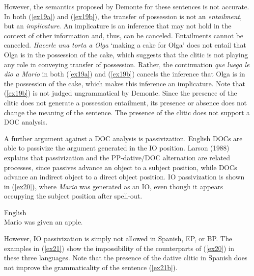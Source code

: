 \documentclass[output=paper,modfonts,nonflat]{langsci/langscibook}
\begin{document}
However, the semantics proposed by Demonte for these sentences is not accurate. In both (\ref{ex19a}) and (\ref{ex19b}), the transfer of possession is not an \textit{entailment}, but an \textit{implicature}. An implicature is an inference that may not hold in the context of other information and, thus, can be canceled. Entailments cannot be canceled. \textit{Hacerle una torta a Olga} ‘making a cake for Olga’ does not entail that Olga is in the possession of the cake, which suggests that the clitic is not playing any role in conveying transfer of possession. Rather, the continuation \textit{que luego le dio a Mario} in both (\ref{ex19a}) and (\ref{ex19b}) cancels the inference that Olga is in the possession of the cake, which makes this inference an implicature. Note that (\ref{ex19b}) is not judged ungrammatical by Demonte. Since the presence of the clitic does not generate a possession entailment, its presence or absence does not change the meaning of the sentence. The presence of the clitic does not support a DOC analysis.

A further argument against a DOC analysis is passivization. English DOCs are able to passivize the argument generated in the IO position. Larson (1988) explains that passivization and the PP-dative/DOC alternation are related processes, since passives advance an object to a subject position, while DOCs advance an indirect object to a direct object position. IO passivization is shown in (\ref{ex20}), where \textit{Mario} was generated as an IO, even though it appears occupying the subject position after spell-out.

\ea \label{ex20} English\\
	Mario was given an apple.
\z

However, IO passivization is simply not allowed in Spanish, EP, or BP. The examples in (\ref{ex21}) show the impossibility of the counterparts of (\ref{ex20}) in these three languages. Note that the presence of the dative clitic in Spanish does not improve the grammaticality of the sentence (\ref{ex21b}).

\ea \label{ex21}
	\label{ex21a}
	\label{ex21b}
	\z
\z
\end{document}
